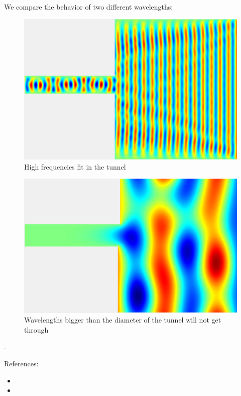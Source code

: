 \documentclass{article}
\begin{document}
We compare the behavior of two different wavelengths:


\begin{figure}
  \includegraphics[width=\linewidth]{highfreq.gif}
  \caption{High frequencies fit in the tunnel}
\end{figure}


\begin{figure}
  \includegraphics[width=\linewidth]{lowfreq.gif}
  \caption{Wavelengths bigger than the diameter of the tunnel will not get through}
\end{figure}.





References: 
\begin{itemize}
\item {}
\item {}
    
\end{itemize}
\end{document}
